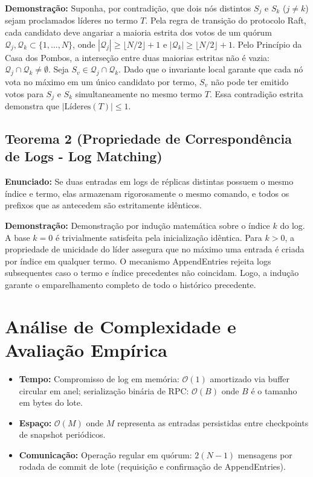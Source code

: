 \documentclass[
  article,
  12pt,
  oneside,
  a4paper,
  english,
  brazil
]{abntex2}
\begin{document}
\textbf{Demonstração:} Suponha, por contradição, que dois nós distintos $S_j$ e $S_k$ ($j \ne k$) sejam proclamados líderes no termo $T$. Pela regra de transição do protocolo Raft, cada candidato deve angariar a maioria estrita dos votos de um quórum $\mathcal{Q}_j, \mathcal{Q}_k \subset \{1, \dots, N\}$, onde $|\mathcal{Q}_j| \ge \lfloor N/2 \rfloor + 1$ e $|\mathcal{Q}_k| \ge \lfloor N/2 \rfloor + 1$. Pelo Princípio da Casa dos Pombos, a interseção entre duas maiorias estritas não é vazia: $\mathcal{Q}_j \cap \mathcal{Q}_k \ne \emptyset$. Seja $S_v \in \mathcal{Q}_j \cap \mathcal{Q}_k$. Dado que o invariante local garante que cada nó vota no máximo em um único candidato por termo, $S_v$ não pode ter emitido votos para $S_j$ e $S_k$ simultaneamente no mesmo termo $T$. Essa contradição estrita demonstra que $|\text{Líderes}(T)| \le 1$.

\subsection{Teorema 2 (Propriedade de Correspondência de Logs - Log Matching)}
\textbf{Enunciado:} Se duas entradas em logs de réplicas distintas possuem o mesmo índice e termo, elas armazenam rigorosamente o mesmo comando, e todos os prefixos que as antecedem são estritamente idênticos.

\textbf{Demonstração:} Demonstração por indução matemática sobre o índice $k$ do log. A base $k=0$ é trivialmente satisfeita pela inicialização idêntica. Para $k > 0$, a propriedade de unicidade do líder assegura que no máximo uma entrada é criada por índice em qualquer termo. O mecanismo AppendEntries rejeita logs subsequentes caso o termo e índice precedentes não coincidam. Logo, a indução garante o emparelhamento completo de todo o histórico precedente.


\section{Análise de Complexidade e Avaliação Empírica}
\begin{itemize}
  \item \textbf{Tempo:} Compromisso de log em memória: $\mathcal{O}(1)$ amortizado via buffer circular em anel; serialização binária de RPC: $\mathcal{O}(B)$ onde $B$ é o tamanho em bytes do lote.
  \item \textbf{Espaço:} $\mathcal{O}(M)$ onde $M$ representa as entradas persistidas entre checkpoints de snapshot periódicos.
  \item \textbf{Comunicação:} Operação regular em quórum: $2(N-1)$ mensagens por rodada de commit de lote (requisição e confirmação de AppendEntries).
\end{itemize}
\end{document}
